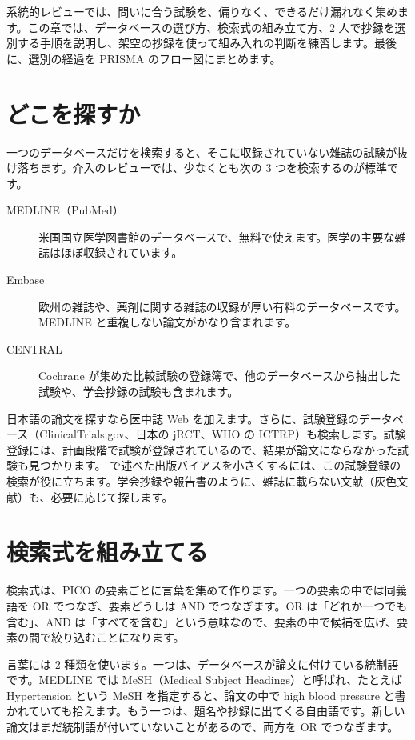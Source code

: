 \begin{chapintro}
系統的レビューでは、問いに合う試験を、偏りなく、できるだけ漏れなく集めます。この章では、データベースの選び方、検索式の組み立て方、2 人で抄録を選別する手順を説明し、架空の抄録を使って組み入れの判断を練習します。最後に、選別の経過を PRISMA のフロー図にまとめます。
\end{chapintro}

\section{どこを探すか}
\label{sec:03-1}

一つのデータベースだけを検索すると、そこに収録されていない雑誌の試験が抜け落ちます。介入のレビューでは、少なくとも次の 3 つを検索するのが標準です。

\begin{description}
\item[MEDLINE（PubMed）] 米国国立医学図書館のデータベースで、無料で使えます。医学の主要な雑誌はほぼ収録されています。
\item[Embase] 欧州の雑誌や、薬剤に関する雑誌の収録が厚い有料のデータベースです。MEDLINE と重複しない論文がかなり含まれます。
\item[CENTRAL] Cochrane が集めた比較試験の登録簿で、他のデータベースから抽出した試験や、学会抄録の試験も含まれます。
\end{description}

日本語の論文を探すなら医中誌 Web を加えます。さらに、試験登録のデータベース（ClinicalTrials.gov、日本の jRCT、WHO の ICTRP）も検索します。試験登録には、計画段階で試験が登録されているので、結果が論文にならなかった試験も見つかります。 で述べた出版バイアスを小さくするには、この試験登録の検索が役に立ちます。学会抄録や報告書のように、雑誌に載らない文献（灰色文献）も、必要に応じて探します。

\section{検索式を組み立てる}
\label{sec:03-2}

検索式は、PICO の要素ごとに言葉を集めて作ります。一つの要素の中では同義語を OR でつなぎ、要素どうしは AND でつなぎます。OR は「どれか一つでも含む」、AND は「すべてを含む」という意味なので、要素の中で候補を広げ、要素の間で絞り込むことになります。

言葉には 2 種類を使います。一つは、データベースが論文に付けている統制語です。MEDLINE では MeSH（Medical Subject Headings）と呼ばれ、たとえば Hypertension という MeSH を指定すると、論文の中で high blood pressure と書かれていても拾えます。もう一つは、題名や抄録に出てくる自由語です。新しい論文はまだ統制語が付いていないことがあるので、両方を OR でつなぎます。

